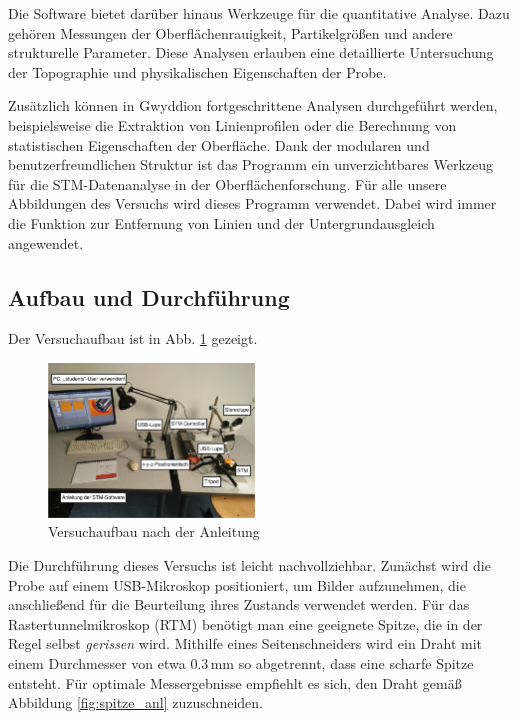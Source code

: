 \documentclass{article}
\begin{document}
Die Software bietet darüber hinaus Werkzeuge für die quantitative Analyse. Dazu gehören Messungen der Oberflächenrauigkeit, Partikelgrößen und andere strukturelle Parameter. Diese Analysen erlauben eine detaillierte Untersuchung der Topographie und physikalischen Eigenschaften der Probe.

Zusätzlich können in Gwyddion fortgeschrittene Analysen durchgeführt werden, beispielsweise die Extraktion von Linienprofilen oder die Berechnung von statistischen Eigenschaften der Oberfläche. Dank der modularen und benutzerfreundlichen Struktur ist das Programm ein unverzichtbares Werkzeug für die STM-Datenanalyse in der Oberflächenforschung.
Für alle unsere Abbildungen des Versuchs wird dieses Programm verwendet.
Dabei wird immer die Funktion zur Entfernung von Linien und der Untergrundausgleich angewendet.


\subsection*{Aufbau und Durchführung}
Der Versuchaufbau ist in Abb. \ref{fig:aufbau} gezeigt.
\begin{figure}[h!]
    \centering
    \includegraphics[width=0.49\textwidth]{aufbau.png}
    \caption{Versuchaufbau nach der Anleitung \cite{Anleitung}}
    \label{fig:aufbau}
\end{figure}

Die Durchführung dieses Versuchs ist leicht nachvollziehbar. Zunächst wird die Probe auf einem
USB-Mikroskop positioniert, um Bilder aufzunehmen, die anschließend für die Beurteilung 
ihres Zustands verwendet werden. Für das Rastertunnelmikroskop (RTM) benötigt man eine 
geeignete Spitze, die in der Regel selbst \textit{gerissen} wird. Mithilfe eines Seitenschneiders 
wird ein Draht mit einem Durchmesser von etwa $0.3 \, \mathrm{mm}$ so abgetrennt, dass 
eine scharfe Spitze entsteht. Für optimale Messergebnisse empfiehlt es sich, den Draht gemäß 
Abbildung \ref{fig:spitze_anl} zuzuschneiden.
\end{document}
